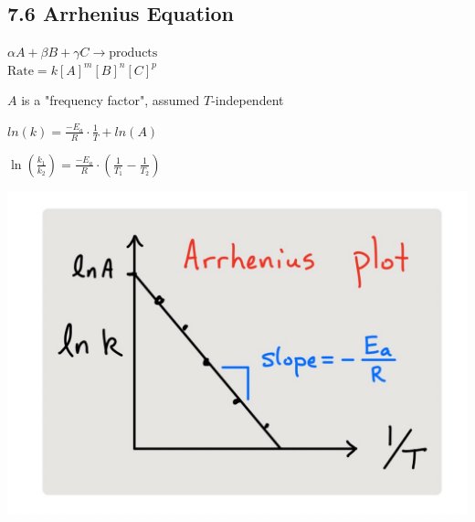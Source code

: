 \subsection{7.6 Arrhenius Equation}
    \vspace*{0.0em}
    $\alpha A + \beta B + \gamma C \longrightarrow \text{products}$\\
    $\text{Rate} = k[A]^m [B]^n [C]^p$


    $A$ is a "frequency factor", assumed $T$-independent
    \vspace*{0.5em}

    \begin{minipage}{0.99\linewidth}
        \begin{minipage}{0.49\linewidth}
            \centerline{$ln(k) = \frac{-E_a}{R} \cdot \frac{1}{T} + ln(A)$}
            \vspace*{0.5em}
            \centerline{$\ln(\frac{k_1}{k_2}) = \frac{-E_a}{R} \cdot \left( \frac{1}{T_1} - \frac{1}{T_2} \right)$}
        \end{minipage}
        \begin{minipage}{0.49\linewidth}
            \centerline{\includegraphics[width=0.8\linewidth]{src/7_Kinetics/images/arrhenius_plot.pdf}}
        \end{minipage}
    \end{minipage}